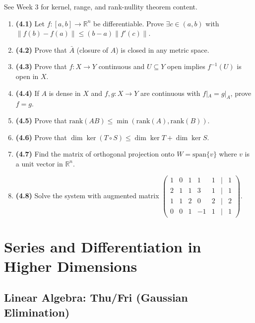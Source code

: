 \documentclass[11pt, letterpaper, openany]{book}
\newcounter{exercise}[chapter]
\begin{document}
See Week 3 for kernel, range, and rank-nullity theorem content.

\begin{exercises}
\begin{enumerate}
    \item \textbf{(4.1)} Let $f: [a,b] \to \mathbb{R}^n$ be differentiable. Prove $\exists c \in (a,b)$ with $\|f(b) - f(a)\| \leq (b-a)\|f'(c)\|$.
    
    \item \textbf{(4.2)} Prove that $\bar{A}$ (closure of $A$) is closed in any metric space.
    
    \item \textbf{(4.3)} Prove that $f: X \to Y$ continuous and $U \subseteq Y$ open implies $f^{-1}(U)$ is open in $X$.
    
    \item \textbf{(4.4)} If $A$ is dense in $X$ and $f, g: X \to Y$ are continuous with $f|_A = g|_A$, prove $f = g$.
    
    \item \textbf{(4.5)} Prove that $\text{rank}(AB) \leq \min(\text{rank}(A), \text{rank}(B))$.
    
    \item \textbf{(4.6)} Prove that $\dim \ker(T \circ S) \leq \dim \ker T + \dim \ker S$.
    
    \item \textbf{(4.7)} Find the matrix of orthogonal projection onto $W = \text{span}\{v\}$ where $v$ is a unit vector in $\mathbb{R}^n$.
    
    \item \textbf{(4.8)} Solve the system with augmented matrix $\begin{pmatrix} 1 & 0 & 1 & 1 & 1 & | & 1 \\ 2 & 1 & 1 & 3 & 1 & | & 1 \\ 1 & 1 & 2 & 0 & 2 & | & 2 \\ 0 & 0 & 1 & -1 & 1 & | & 1 \end{pmatrix}$.
\end{enumerate}
\end{exercises}

\chapter{Series and Differentiation in Higher Dimensions}

\section{Linear Algebra: Thu/Fri (Gaussian Elimination)}
\end{document}
